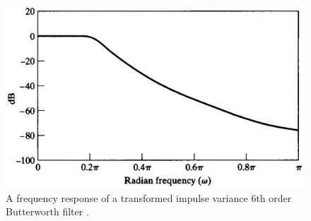 \begin{figure}[H]
	\centering
	\includegraphics[scale=0.2]{figures/BilinearFrequencyResponse.pdf}
	\caption{A frequency response of a transformed impulse variance 6th order Butterworth filter \cite{AVOppenheim}.}
	\label{fig:ImpulseVariantFrequencyResponse}
\end{figure}\vspace{-5mm}

